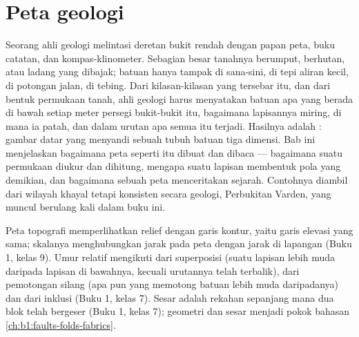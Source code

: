 \chapter{Peta geologi}\label{ch:b1:geological-maps}

Seorang ahli geologi melintasi deretan bukit rendah dengan papan peta, buku catatan, dan kompas-klinometer. Sebagian besar tanahnya berumput, berhutan, atau ladang yang dibajak; batuan hanya tampak di sana-sini, di tepi aliran kecil, di potongan jalan, di tebing. Dari kilasan-kilasan yang tersebar itu, dan dari bentuk permukaan tanah, ahli geologi harus menyatakan batuan apa yang berada di bawah setiap meter persegi bukit-bukit itu, bagaimana lapisannya miring, di mana ia patah, dan dalam urutan apa semua itu terjadi. Hasilnya adalah : gambar datar yang menyandi sebuah tubuh batuan tiga dimensi. Bab ini menjelaskan bagaimana peta seperti itu dibuat dan dibaca --- bagaimana  suatu permukaan diukur dan dihitung, mengapa  suatu lapisan membentuk pola yang demikian, dan bagaimana sebuah peta menceritakan sejarah. Contohnya diambil dari wilayah khayal tetapi konsisten secara geologi, Perbukitan Varden, yang muncul berulang kali dalam buku ini.

\begin{recall}
Peta topografi memperlihatkan relief dengan garis kontur, yaitu garis elevasi yang sama; skalanya menghubungkan jarak pada peta dengan jarak di lapangan (Buku 1, kelas 9). Umur relatif mengikuti dari superposisi (suatu lapisan lebih muda daripada lapisan di bawahnya, kecuali urutannya telah terbalik), dari pemotongan silang (apa pun yang memotong batuan lebih muda daripadanya) dan dari inklusi (Buku 1, kelas 7). Sesar adalah rekahan sepanjang mana dua blok telah bergeser (Buku 1, kelas 7); geometri  dan sesar menjadi pokok bahasan \cref{ch:b1:faults-folds-fabrics}.
\end{recall}


